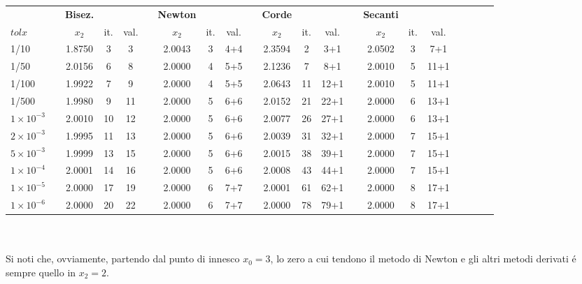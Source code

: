 \footnotesize\noindent\begin{tabular}{l*{20}{c}}
& \vline& \tiny\textbf{Bisez.} &     &      & \vline& \tiny\textbf{Newton} &     &      &\vline& \tiny\textbf{Corde} &    &      &\vline& \tiny\textbf{Secanti} \\
 \(tolx\) & \vline& \(x_2\)   & it. & val. & \vline& \(x_2\)   & it. & val.  &\vline& \(x_2\)  & it.& val. &\vline& \(x_2\) & it.&val.\\
\hline
 1/10                 &\vline& 1.8750 & 3  & 3  &\vline& 2.0043 & 3 & 4+4 &\vline& 2.3594 & 2 & 3+1  &\vline& 2.0502 & 3 & 7+1  \\
 1/50                 &\vline& 2.0156 & 6  & 8  &\vline& 2.0000 & 4 & 5+5 &\vline& 2.1236 & 7 & 8+1  &\vline& 2.0010 & 5 & 11+1 \\
 1/100                &\vline& 1.9922 & 7  & 9  &\vline& 2.0000 & 4 & 5+5 &\vline& 2.0643 & 11& 12+1 &\vline& 2.0010 & 5 & 11+1 \\
 1/500                &\vline& 1.9980 & 9  & 11 &\vline& 2.0000 & 5 & 6+6 &\vline& 2.0152 & 21& 22+1 &\vline& 2.0000 & 6 & 13+1 \\
 \(1 \times 10^{-3}\) &\vline& 2.0010 & 10 & 12 &\vline& 2.0000 & 5 & 6+6 &\vline& 2.0077 & 26& 27+1 &\vline& 2.0000 & 6 & 13+1 \\
 \(2 \times 10^{-3}\) &\vline& 1.9995 & 11 & 13 &\vline& 2.0000 & 5 & 6+6 &\vline& 2.0039 & 31& 32+1 &\vline& 2.0000 & 7 & 15+1 \\
 \(5 \times 10^{-3}\) &\vline& 1.9999 & 13 & 15 &\vline& 2.0000 & 5 & 6+6 &\vline& 2.0015 & 38& 39+1 &\vline& 2.0000 & 7 & 15+1 \\
 \(1 \times 10^{-4}\) &\vline& 2.0001 & 14 & 16 &\vline& 2.0000 & 5 & 6+6 &\vline& 2.0008 & 43& 44+1 &\vline& 2.0000 & 7 & 15+1 \\
 \(1 \times 10^{-5}\) &\vline& 2.0000 & 17 & 19 &\vline& 2.0000 & 6 & 7+7 &\vline& 2.0001 & 61& 62+1 &\vline& 2.0000 & 8 & 17+1  \\
 \(1 \times 10^{-6}\) &\vline& 2.0000 & 20 & 22 &\vline& 2.0000 & 6 & 7+7 &\vline& 2.0000 & 78& 79+1 &\vline& 2.0000 & 8 & 17+1  \\
\end{tabular}\\
\\

\normalsize\noindent Si noti che, ovviamente, partendo dal punto di innesco \(x_0 = 3\), lo zero a cui tendono il metodo di Newton e gli altri metodi derivati \'e sempre quello in \(x_2 = 2\).
\\

